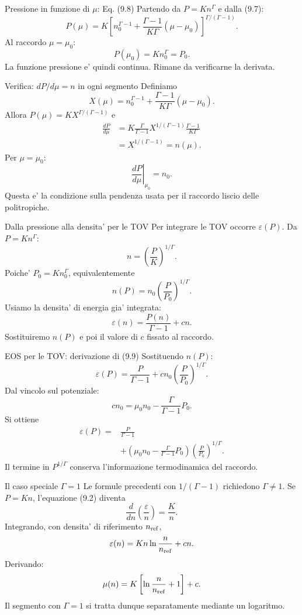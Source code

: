 \begin{frame}{Pressione in funzione di $\mu$: Eq. (9.8)}
\small
Partendo da $P=Kn^\Gamma$ e dalla (9.7):
\[
{
P(\mu)=K\left[
 n_0^{\Gamma-1}+\frac{\Gamma-1}{K\Gamma}(\mu-\mu_0)
\right]^{\Gamma/(\Gamma-1)}.}
\]
Al raccordo $\mu=\mu_0$:
\[
P(\mu_0)=Kn_0^\Gamma=P_0.
\]
La funzione pressione e' quindi continua. Rimane da verificarne la derivata.
\end{frame}

\begin{frame}{Verifica: $dP/d\mu=n$ in ogni segmento}
\small
Definiamo
\[
X(\mu)=n_0^{\Gamma-1}+\frac{\Gamma-1}{K\Gamma}(\mu-\mu_0).
\]
Allora $P(\mu)=KX^{\Gamma/(\Gamma-1)}$ e
\[
\begin{aligned}
\frac{dP}{d\mu}
&=K\frac{\Gamma}{\Gamma-1}X^{1/(\Gamma-1)}
\frac{\Gamma-1}{K\Gamma}\\
&=X^{1/(\Gamma-1)}=n(\mu).
\end{aligned}
\]
Per $\mu=\mu_0$:
\[
{\left.\frac{dP}{d\mu}\right|_{\mu_0}=n_0.}
\]
Questa e' la condizione sulla pendenza usata per il raccordo liscio delle politropiche.
\end{frame}

\begin{frame}{Dalla pressione alla densita' per le TOV}
\small
Per integrare le TOV occorre $\varepsilon(P)$.
\medskip
Da $P=Kn^\Gamma$:
\[
n=\left(\frac PK\right)^{1/\Gamma}.
\]
Poiche' $P_0=Kn_0^\Gamma$, equivalentemente
\[
{n(P)=n_0\left(\frac P{P_0}\right)^{1/\Gamma}.}
\]
Usiamo la densita' di energia gia' integrata:
\[
\varepsilon(n)=\frac{P(n)}{\Gamma-1}+cn.
\]
Sostituiremo $n(P)$ e poi il valore di $c$ fissato al raccordo.
\end{frame}

\begin{frame}{EOS per le TOV: derivazione di (9.9)}
\small
Sostituendo $n(P)$:
\[
\varepsilon(P)=\frac{P}{\Gamma-1}+cn_0\left(\frac{P}{P_0}\right)^{1/\Gamma}.
\]
Dal vincolo sul potenziale:
\[
cn_0=\mu_0n_0-\frac{\Gamma}{\Gamma-1}P_0.
\]
Si ottiene
\[
{
\begin{aligned}
\varepsilon(P)={}&\frac{P}{\Gamma-1}\\
&+\left(\mu_0n_0-\frac{\Gamma}{\Gamma-1}P_0\right)
\left(\frac{P}{P_0}\right)^{1/\Gamma}.
\end{aligned}}
\]
Il termine in $P^{1/\Gamma}$ conserva l'informazione termodinamica del raccordo.
\end{frame}

\begin{frame}{Il caso speciale $\Gamma=1$}
\small
Le formule precedenti con $1/(\Gamma-1)$ richiedono $\Gamma\ne1$.
\medskip
Se $P=Kn$, l'equazione (9.2) diventa
\[
\frac{d}{dn}\left(\frac{\varepsilon}{n}\right)=\frac Kn.
\]
Integrando, con densita' di riferimento $n_{\rm ref}$,
\[
{\varepsilon(n)=Kn\ln\frac{n}{n_{\rm ref}}+cn.}
\]
Derivando:
\[
{\mu(n)=K\left[\ln\frac{n}{n_{\rm ref}}+1\right]+c.}
\]
Il segmento con $\Gamma=1$ si tratta dunque separatamente mediante un logaritmo.
\end{frame}

